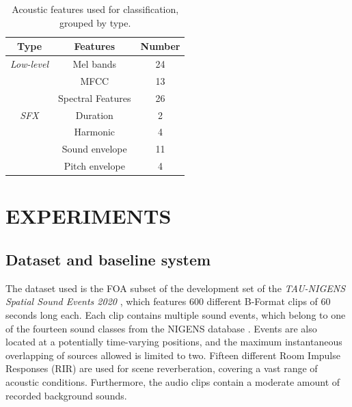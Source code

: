 \begin{table}[t!]
\caption{Acoustic features used for classification, grouped by type.}
\begin{footnotesize}
\begin{center}
\begin{tabular}{ccc}
\toprule
Type & Features & Number \\
\midrule
\textit{Low-level} & Mel bands & 24       \\
& MFCC & 13 \\
& Spectral Features & 26 \\
\midrule
\textit{SFX }& Duration &2 \\
& Harmonic & 4 \\
& Sound envelope & 11\\
& Pitch envelope & 4\\
\bottomrule
\end{tabular}
\end{center}
\end{footnotesize}
\label{tab:features}
\end{table}




\section{EXPERIMENTS}
\label{sec:experiments}


\subsection{Dataset and baseline system}

The dataset used is the FOA subset of the development set of the \textit{TAU-NIGENS Spatial Sound Events 2020} \cite{politis2020dataset}, which features 600 different B-Format clips of 60 seconds long each. 
Each clip contains multiple sound events, which belong to one of the fourteen sound classes from the NIGENS database \cite{trowitzsch2019nigens}.
Events are also located at a potentially time-varying positions, and the maximum instantaneous overlapping of sources allowed is limited to two. Fifteen different Room Impulse Responses (RIR) are used for scene reverberation, covering a vast range of acoustic conditions. Furthermore, the audio clips contain a moderate amount of recorded background sounds. 

